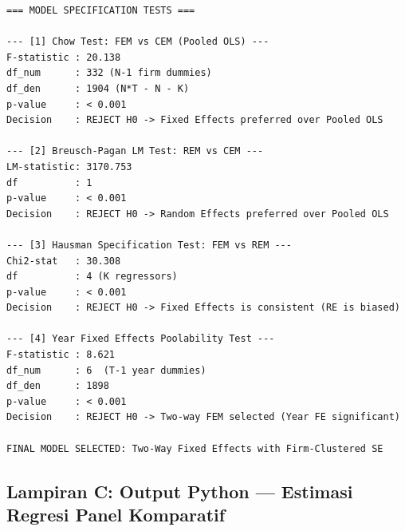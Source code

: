 \documentclass[12pt,a4paper]{article}
\begin{document}
\begin{small}
\begin{verbatim}
=== MODEL SPECIFICATION TESTS ===

--- [1] Chow Test: FEM vs CEM (Pooled OLS) ---
F-statistic : 20.138
df_num      : 332 (N-1 firm dummies)
df_den      : 1904 (N*T - N - K)
p-value     : < 0.001
Decision    : REJECT H0 -> Fixed Effects preferred over Pooled OLS

--- [2] Breusch-Pagan LM Test: REM vs CEM ---
LM-statistic: 3170.753
df          : 1
p-value     : < 0.001
Decision    : REJECT H0 -> Random Effects preferred over Pooled OLS

--- [3] Hausman Specification Test: FEM vs REM ---
Chi2-stat   : 30.308
df          : 4 (K regressors)
p-value     : < 0.001
Decision    : REJECT H0 -> Fixed Effects is consistent (RE is biased)

--- [4] Year Fixed Effects Poolability Test ---
F-statistic : 8.621
df_num      : 6  (T-1 year dummies)
df_den      : 1898
p-value     : < 0.001
Decision    : REJECT H0 -> Two-way FEM selected (Year FE significant)

FINAL MODEL SELECTED: Two-Way Fixed Effects with Firm-Clustered SE
\end{verbatim}
\end{small}

\subsection{Lampiran C: Output Python --- Estimasi Regresi Panel
Komparatif}\label{lampiran-c-output-python-estimasi-regresi-panel-komparatif}
\end{document}
